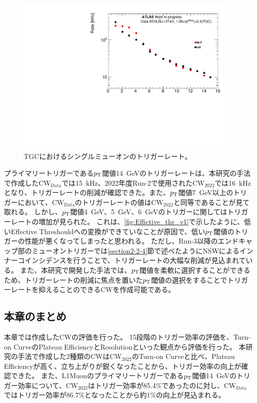 \begin{figure}[tb]
  \centering
  \includegraphics[clip, width=11cm]{fig/5/15rate.pdf}
  \caption{TGCにおけるシングルミューオンのトリガーレート。}
  \label{fig:Ratev05v06}
\end{figure}
プライマリートリガーである$p_{\rm{T}}$閾値14~GeVのトリガーレートは、本研究の手法で作成した$\mathrm{CW_{Data}}$では15~kHz、2022年度Run-2で使用された$\mathrm{CW_{2022}}$では16~kHzとなり、トリガーレートの削減が確認できた。また、$p_{\rm{T}}$閾値7~GeV以上のトリガーにおいて、$\mathrm{CW_{Data}}$のトリガーレートの値は$\mathrm{CW_{2022}}$と同等であることが見て取れる。
しかし、$p_{\rm{T}}$閾値4~GeV、5~GeV、6~GeVのトリガーに関してはトリガーレートの増加が見られた。
これは、\ref{fig:Effictive_thr_v1}で示したように、低いEffective Threshouldへの変換ができていなことが原因で、低い$p_{\rm{T}}$閾値のトリガーの性能が悪くなってしまったと思われる。
ただし、Run-3以降のエンドキャップ部のミューオントリガーでは\ref{section2-2-4}節で述べたようにNSWによるインナーコインシデンスを行うことで、トリガーレートの大幅な削減が見込まれている。
また、本研究で開発した手法では、$p_{\rm{T}}$閾値を柔軟に選択することができるため、トリガーレートの削減に焦点を置いた$p_{\rm{T}}$閾値の選択をすることでトリガーレートを抑えることのできるCWを作成可能である。



\subsection{本章のまとめ}
本章では作成したCWの評価を行った。
15段階のトリガー効率の評価を、Turn-on CurveのPlateau EfficiencyとResolutionといった観点から評価を行った。
本研究の手法で作成した2種類のCWは$\mathrm{CW_{2022}}$のTurn-on Curveと比べ、Plateau Efficiencyが高く、立ち上がりが鋭くなったことから、トリガー効率の向上が確認できた。
また、L1Muonのプライマリートリガーである$p_{\rm{T}}$閾値14~GeVのトリガー効率について、$\mathrm{CW_{2022}}$はトリガー効率が85.4$\%$であったのに対し、$\mathrm{CW_{Data}}$ではトリガー効率が86.7$\%$となったことから約1$\%$の向上が見込まれる。

